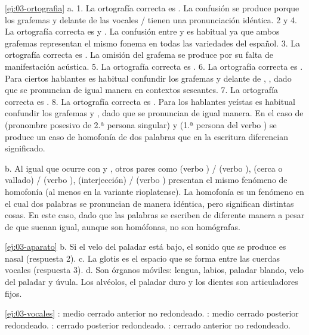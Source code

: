 \begin{solucion}{\ref{ej:03-ortografia}}
a. 1. La ortografía correcta es . La confusión se produce porque
los grafemas  y  delante de las vocales / tienen
una pronunciación idéntica. 2 y 4. La ortografía correcta es  y
. La confusión entre  y  es habitual ya que ambos
grafemas representan el mismo fonema en todas las variedades del español. 3. La
ortografía correcta es . La omisión del grafema  se
produce por su falta de manifestación acústica. 5. La ortografía correcta es
. 6. La ortografía correcta es . Para ciertos
hablantes es habitual confundir los grafemas  y  delante de
, , dado que se pronuncian de igual manera en contextos
seseantes. 7. La ortografía correcta es . 8. La ortografía correcta
es . Para los hablantes yeístas es habitual confundir los grafemas
 y , dado que se pronuncian de igual manera. En el caso de
 (pronombre posesivo de 2.ª persona singular) y 
(1.ª persona del verbo ) se produce un caso de homofonía de dos
palabras que en la escritura diferencian significado.

b. Al igual que ocurre con  y , otros pares
como  (verbo ) /  (verbo ),
 (cerca o vallado) /  (verbo ), 
(interjección) /  (verbo ) presentan el mismo fenómeno de
homofonía (al menos en la variante rioplatense). La homofonía es un fenómeno en
el cual dos palabras se pronuncian de manera idéntica, pero significan distintas
cosas. En este caso, dado que las palabras se escriben de diferente manera a
pesar de que suenan igual, aunque son homófonas, no son homógrafas.
\end{solucion}

\begin{solucion}{\ref{ej:03-aparato}}
b. Si el velo del paladar está bajo, el sonido que se produce es nasal
(respuesta 2). c. La glotis es el espacio que se forma entre las cuerdas vocales
(respuesta 3). d. Son órganos móviles: lengua, labios, paladar blando, velo del
paladar y úvula. Los alvéolos, el paladar duro y los dientes son articuladores
fijos.
\end{solucion}

\begin{solucion}{\ref{ej:03-vocales}}
 : medio cerrado anterior no redondeado. 
: medio cerrado posterior redondeado.  : cerrado
posterior redondeado.  : cerrado anterior no redondeado.
\end{solucion}

